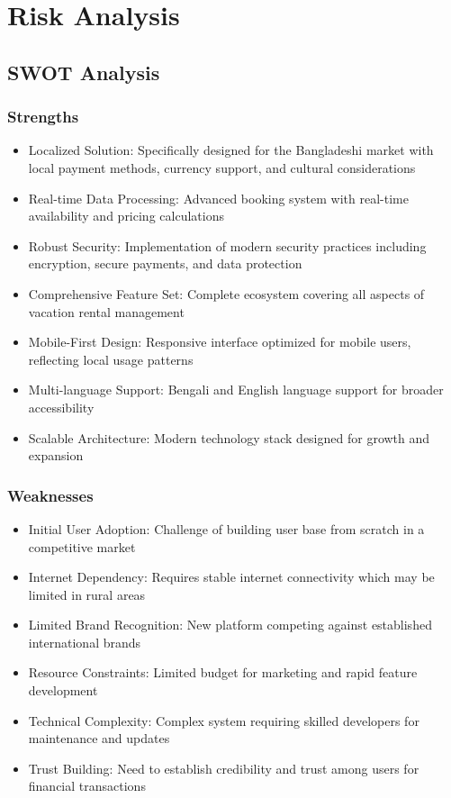 \documentclass[12pt,a4paper]{report}
\begin{document}
\chapter{Risk Analysis}

\section{SWOT Analysis}

\subsection{Strengths}
\begin{itemize}
    \item Localized Solution: Specifically designed for the Bangladeshi market with local payment methods, currency support, and cultural considerations
    \item Real-time Data Processing: Advanced booking system with real-time availability and pricing calculations
    \item Robust Security: Implementation of modern security practices including encryption, secure payments, and data protection
    \item Comprehensive Feature Set: Complete ecosystem covering all aspects of vacation rental management
    \item Mobile-First Design: Responsive interface optimized for mobile users, reflecting local usage patterns
    \item Multi-language Support: Bengali and English language support for broader accessibility
    \item Scalable Architecture: Modern technology stack designed for growth and expansion
\end{itemize}

\subsection{Weaknesses}
\begin{itemize}
    \item Initial User Adoption: Challenge of building user base from scratch in a competitive market
    \item Internet Dependency: Requires stable internet connectivity which may be limited in rural areas
    \item Limited Brand Recognition: New platform competing against established international brands
    \item Resource Constraints: Limited budget for marketing and rapid feature development
    \item Technical Complexity: Complex system requiring skilled developers for maintenance and updates
    \item Trust Building: Need to establish credibility and trust among users for financial transactions
\end{itemize}
\end{document}
